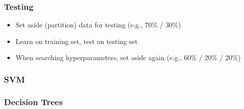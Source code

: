 \begin{frame}
  \frametitle{Testing}
  \begin{itemize}
  \item Set aside (partition) data for testing (e.g., 70\% / 30\%)
  \item Learn on training set, test on testing set
  \item When searching hyperparameters, set aside again (e.g., 60\% / 20\% / 20\%)
  \end{itemize}
\end{frame}

\begin{frame}
  \frametitle{SVM}
\end{frame}

\begin{frame}
  \frametitle{Decision Trees}
\end{frame}
